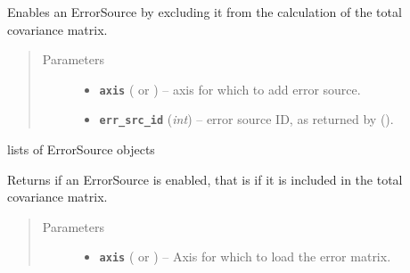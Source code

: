 \documentclass[a4paper,10pt,english]{sphinxmanual}
\begin{document}
\begin{fulllineitems}
\begin{fulllineitems}
\label{module_doc:kafe.dataset.Dataset.enable_error_source}
Enables an ErrorSource by excluding it from the calculation of the
total covariance matrix.
\begin{quote}\begin{description}
\item[{Parameters}] \leavevmode\begin{itemize}
\item {} 
\textbf{\texttt{axis}} ( or ) -- axis for which to add error source.

\item {} 
\textbf{\texttt{err\_src\_id}} (\emph{int}) -- error source ID, as returned by
{\hyperref[module_doc:kafe.dataset.Dataset.add_error_source]{\emph{}}} ().

\end{itemize}

\end{description}\end{quote}

\end{fulllineitems}


\begin{fulllineitems}
\label{module_doc:kafe.dataset.Dataset.err_src}
lists of ErrorSource objects

\end{fulllineitems}


\begin{fulllineitems}
\label{module_doc:kafe.dataset.Dataset.error_source_is_enabled}
Returns  if an ErrorSource is enabled, that is if it is included
in the total covariance matrix.
\begin{quote}\begin{description}
\item[{Parameters}] \leavevmode\begin{itemize}
\item {} 
\textbf{\texttt{axis}} ( or ) -- Axis for which to load the error matrix.


\end{itemize}
\end{description}
\end{quote}
\end{fulllineitems}
\end{fulllineitems}
\end{document}
